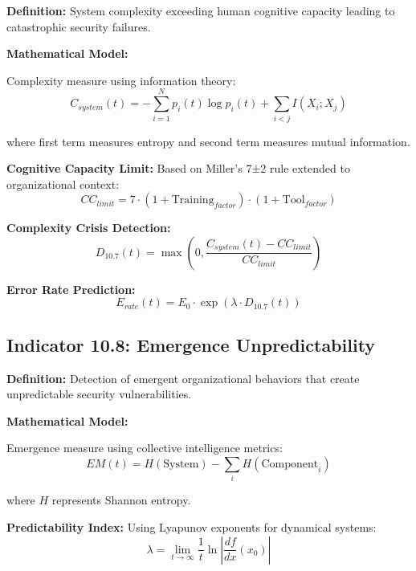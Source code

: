 \documentclass[11pt,a4paper]{article}
\begin{document}
\textbf{Definition:} System complexity exceeding human cognitive capacity leading to catastrophic security failures.

\textbf{Mathematical Model:}

Complexity measure using information theory:
\begin{equation}
C_{system}(t) = -\sum_{i=1}^{N} p_i(t) \log p_i(t) + \sum_{i<j} I(X_i; X_j)
\end{equation}

where first term measures entropy and second term measures mutual information.

\textbf{Cognitive Capacity Limit:}
Based on Miller's 7±2 rule extended to organizational context:
\begin{equation}
CC_{limit} = 7 \cdot (1 + \text{Training}_{factor}) \cdot (1 + \text{Tool}_{factor})
\end{equation}

\textbf{Complexity Crisis Detection:}
\begin{equation}
D_{10.7}(t) = \max\left(0, \frac{C_{system}(t) - CC_{limit}}{CC_{limit}}\right)
\end{equation}

\textbf{Error Rate Prediction:}
\begin{equation}
E_{rate}(t) = E_0 \cdot \exp\left(\lambda \cdot D_{10.7}(t)\right)
\end{equation}

\subsection{Indicator 10.8: Emergence Unpredictability}

\textbf{Definition:} Detection of emergent organizational behaviors that create unpredictable security vulnerabilities.

\textbf{Mathematical Model:}

Emergence measure using collective intelligence metrics:
\begin{equation}
EM(t) = H(\text{System}) - \sum_{i} H(\text{Component}_i)
\end{equation}

where $H$ represents Shannon entropy.

\textbf{Predictability Index:}
Using Lyapunov exponents for dynamical systems:
\begin{equation}
\lambda = \lim_{t \to \infty} \frac{1}{t} \ln\left|\frac{df}{dx}(x_0)\right|
\end{equation}
\end{document}
